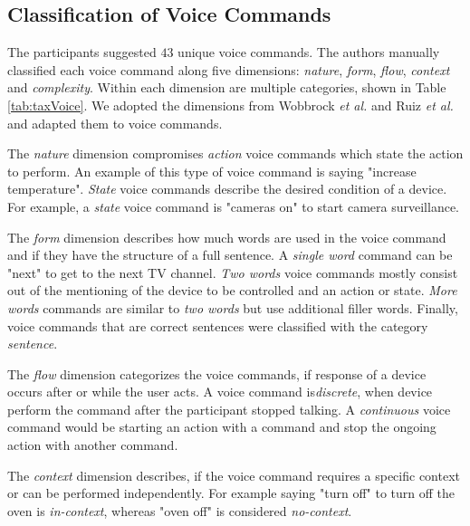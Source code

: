 \documentclass[sigchi]{acmart}
\begin{document}
\subsection{Classification of Voice Commands}
The participants suggested $43$ unique voice commands. The authors manually classified each voice command along five dimensions: \textit{nature}, \textit{form}, \textit{flow}, \textit{context} and \textit{complexity}. Within each dimension are multiple categories, shown in Table \ref{tab:taxVoice}. We adopted the dimensions from Wobbrock \textit{et al.} \citep{Wobbrock.2009} and Ruiz \textit{et al.} \citep{Ruiz.2011} and adapted them to voice commands. 

The \textit{nature} dimension compromises \textit{action} voice commands which state the action to perform. An example of this type of voice command is saying "increase temperature". \textit{State} voice commands describe the desired condition of a device. For example, a \textit{state} voice command is "cameras on" to start camera surveillance.

The \textit{form} dimension describes how much words are used in the voice command and if they have the structure of a full sentence. A \textit{single word} command can be "next" to get to the next TV channel. \textit{Two words} voice commands mostly consist out of the mentioning of the device to be controlled and an action or state. \textit{More words} commands are similar to \textit{two words} but use additional filler words. Finally, voice commands that are correct sentences were classified with the category \textit{sentence}.

The \textit{flow} dimension categorizes the voice commands, if response of a device occurs after or while the user acts. A voice command is\textit{discrete}, when device perform the command after the participant stopped talking. A \textit{continuous} voice command would be starting an action with a command and stop the ongoing action with another command.

The \textit{context} dimension describes, if the voice command requires a specific context or can be performed independently. For example saying "turn off" to turn off the oven is \textit{in-context}, whereas "oven off" is considered \textit{no-context}.
\end{document}
